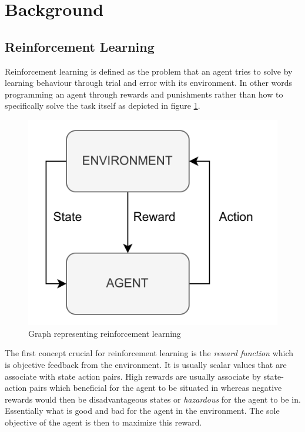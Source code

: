 \section{Background}

\subsection{Reinforcement Learning}

Reinforcement learning is defined as the problem that an agent tries to solve by learning behaviour through trial and error with its environment. In other words programming an agent through rewards and punishments rather than how to specifically solve the task itself\cite{kaelbling1996reinforcement} as depicted in figure \ref{figRL}.
\begin{figure}[H]
    \centering
    \includegraphics [scale = 0.2]{Images/RL_graph.png}
    \caption{Graph representing reinforcement learning}
    \label{figRL}
\end{figure}
The first concept crucial for reinforcement learning is the \textit{reward function} which is objective feedback from the environment. It is usually scalar values that are associate with state action pairs. High rewards are usually associate by state-action pairs which beneficial for the agent to be situated in whereas negative rewards would then be disadvantageous states or \textit{hazardous} for the agent to be in. Essentially what is good and bad for the agent in the environment. The sole objective of the agent is then to maximize this reward\cite{sutton1999reinforcement}.

